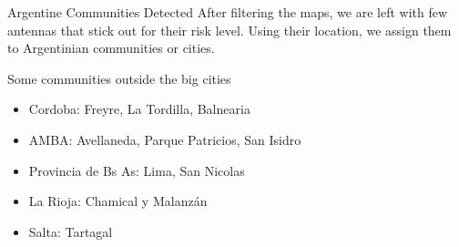 \documentclass{beamer}
\begin{document}
\begin{frame}{Argentine Communities Detected}
	After filtering the maps, we are left with few antennas that stick out for their risk level. Using their location, we assign them to Argentinian communities or cities.


	\bigskip

	\begin{block}{Some communities outside the big cities}
		\begin{itemize}
			\item Cordoba: Freyre, La Tordilla, Balnearia
			\item AMBA: Avellaneda, Parque Patricios, San Isidro
			\item Provincia de Bs As: Lima, San Nicolas
			\item La Rioja: Chamical y Malanz\'an
			\item Salta: Tartagal
		\end{itemize}

	\end{block}
\end{frame}



\end{document}
